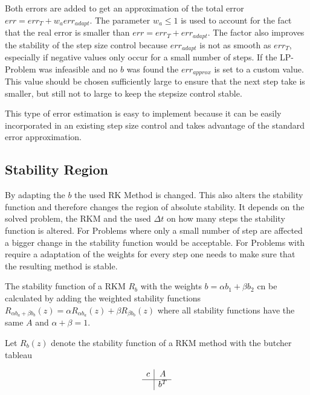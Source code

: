 \documentclass{article}
\begin{document}
Both errors are added to get an approximation of the total error $err = err_T +w_a err_{adapt}$. The parameter $w_a \leq 1$ is used to account for the fact that the real error is smaller than $err = err_T +err_{adapt}$. The factor also improves the stability of the step size control because $err_{adapt}$ is not as smooth as $err_T$, especially if negative values only occur for a small number of steps.
If the LP-Problem was infeasible and no $b$ was found the $err_{approx}$ is set to a custom value. This value should be chosen sufficiently large to ensure that the next step take is smaller, but still not to large to keep the stepsize control stable.

This type of error estimation is easy to implement because it can be easily incorporated in an existing step size control and takes advantage of the standard error approximation.



\subsection{Stability Region}

By adapting the $b$ the used RK Method is changed. This also alters the stability function and therefore changes the region of absolute stability. 
It depends on the solved problem, the RKM and the used $\Delta t$ on how many steps the stability function is altered. For Problems where only a small number of step are affected a bigger change in the stability function would be acceptable. For Problems with require a adaptation of the weights for every step one needs to make sure that the resulting method is stable.


The stability function of a RKM  $R_b$  with the weights $b = \alpha b_1 + \beta b_2$ cn be calculated by adding the weighted stability functions $R_{\alpha b_a+\beta b_b}(z) = \alpha R_{\alpha b_a}(z) + \beta R_{\beta b_b}(z) $ where all stability functions have the same $A$ and $\alpha + \beta = 1$.

Let $R_b(z)$ denote the stability function of a RKM method with the butcher tableau

$$
\begin{array}
{c|c}
c & A\\
\hline
& b^T
\end{array}
$$
\end{document}
